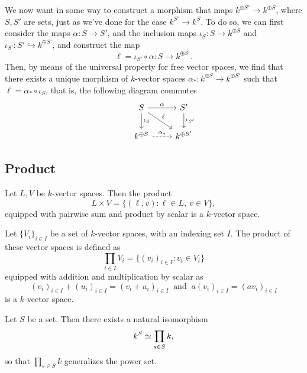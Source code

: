 We now want in some way to construct a morphism that maps \(k^{\oplus S'} \to
k^{\oplus S}\), where \(S, S'\) are sets, just as we've done for the case
\(k^{S'} \to k^S\). To do so, we can first consider the maps \(\alpha: S \to
S'\), and the inclusion maps \(\iota_S : S \to k^{\oplus S}\) and \(\iota_{S'} :
S' \hookrightarrow k^{\oplus S'}\), and construct the map
\[
   \ell = \iota_{S'} \circ \alpha : S \to k^{\oplus S'}.
\]
Then, by means of the universal property for free vector spaces, we find that
there exists a unique morphism of \(k\)-vector spaces \(\alpha_\ast : k^{\oplus
S} \to k^{\oplus S'} \) such that \(\ell = \alpha_\ast \circ \iota_S\), that is,
the following diagram commutes
\[
   \begin{tikzcd}
      &S \arrow[r, "\alpha"] \arrow[d, "\iota_S"] \arrow[dr, "\ell"]
      &S' \arrow[d, "\iota_{S'}"]
      \\
      &k^{\oplus S} \arrow[r, dashed, "\alpha_\ast"]
      &k^{\oplus S'}
   \end{tikzcd}
\]

\subsection{Product}

\begin{definition}
   Let \(L, V\) be \(k\)-vector spaces. Then the product
   \[
      L \times V = \{(\ell, v) : \ell \in L,\ v \in V\},
   \]
   equipped with pairwise sum and product by scalar is a \(k\)-vector space.
\end{definition}

\begin{definition}
   Let \(\{V_i\}_{i \in I}\) be a set of \(k\)-vector spaces, with an indexing
   set \(I\). The product of these vector spaces is defined as
   \[
      \prod_{i \in I} V_i = \{(v_i)_{i \in I} : v_i \in V_i\}
   \]
   equipped with addition and multiplication by scalar as
   \[
      (v_i)_{i \in I} + (u_i)_{i \in I} = (v_i + u_i)_{i \in I}\ \text{ and }\
      a(v_i)_{i \in I} = (av_i)_{i \in I}
   \]
   is a \(k\)-vector space.
\end{definition}

\begin{proposition}
   Let \(S\) be a set. Then there exists a natural isomorphism
   \[
      k^S \simeq \prod_{s \in S} k,
   \]
   so that \(\prod_{s \in S} k\) generalizes the power set.
\end{proposition}

